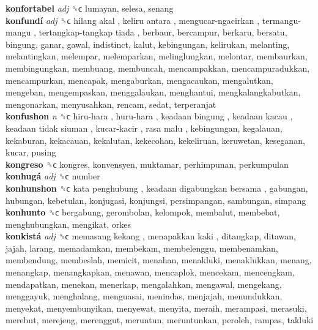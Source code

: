 \textbf{konfortabel} \emph{adj}  ␝ϲ  lumayan, selesa, senang  \\
\textbf{konfundí} \emph{adj}  ␝ϲ   hilang akal ,  keliru antara ,  mengucar-ngacirkan ,  termangu-mangu ,  tertangkap-tangkap tiada , berbaur, bercampur, berkaru, bersatu, bingung, ganar, gawal, indistinct, kalut, kebingungan, kelirukan, melanting, melantingkan, melempar, melemparkan, melinglungkan, melontar, membaurkan, membingungkan, membuang, membuncah, mencampakkan, mencampuradukkan, mencampurkan, mencapak, mengaburkan, mengacaukan, mengalutkan, mengeban, mengempaskan, menggalaukan, menghantui, mengkalangkabutkan, mengonarkan, menyusahkan, rencam, sedat, terperanjat  \\
\textbf{konfushon} \emph{n}  ␝ϲ   hiru-hara ,  huru-hara ,  keadaan bingung ,  keadaan kacau ,  keadaan tidak siuman ,  kucar-kacir ,  rasa malu , kebingungan, kegalauan, kekaburan, kekacauan, kekalutan, kekecohan, kekeliruan, keruwetan, keseganan, kucar, pusing  \\
\textbf{kongreso} ␝ϲ  kongres, konvensyen, muktamar, perhimpunan, perkumpulan  \\
\textbf{konhugá} \emph{adj}  ␝ϲ  number  \\
\textbf{konhunshon} ␝ϲ   kata penghubung ,  keadaan digabungkan bersama , gabungan, hubungan, kebetulan, konjugasi, konjungsi, persimpangan, sambungan, simpang  \\
\textbf{konhunto} ␝ϲ  bergabung, gerombolan, kelompok, membalut, membebat, menghubungkan, mengikat, orkes  \\
\textbf{konkistá} \emph{adj}  ␝ϲ   memasang kekang ,  menapakkan kaki , ditangkap, ditawan, jajah, larang, memadamkan, membekam, membelenggu, membenamkan, membendung, membeslah, memicit, menahan, menakluki, menaklukkan, menang, menangkap, menangkapkan, menawan, mencaplok, mencekam, mencengkam, mendapatkan, menekan, menerkap, mengalahkan, mengawal, mengekang, menggayuk, menghalang, menguasai, menindas, menjajah, menundukkan, menyekat, menyembunyikan, menyewat, menyita, meraih, merampasi, merasuki, merebut, merejeng, merenggut, meruntun, meruntunkan, peroleh, rampas, takluki  \\
